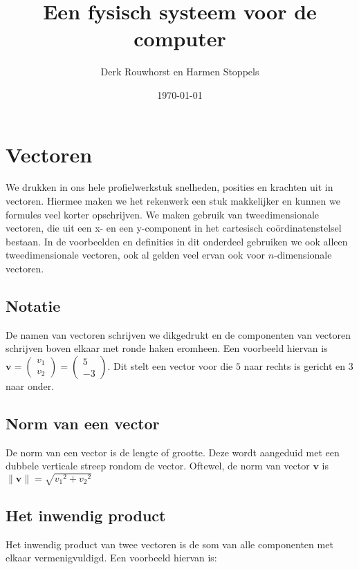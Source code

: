 \documentclass[12pt,a4paper]{article}
\title{Een fysisch systeem voor de computer}
\date{\today}
\author{Derk Rouwhorst en Harmen Stoppels}
\begin{document}
	\begin{titlepage}
	\maketitle
	\end{titlepage}
	
	\section{Vectoren}
	We drukken in ons hele profielwerkstuk snelheden, posities en krachten uit in vectoren. Hiermee maken we het rekenwerk een stuk makkelijker en kunnen we formules veel korter opschrijven. We maken gebruik van tweedimensionale vectoren, die uit een x- en een y-component in het cartesisch co\"{o}rdinatenstelsel bestaan. In de voorbeelden en definities in dit onderdeel gebruiken we ook alleen tweedimensionale vectoren, ook al gelden veel ervan ook voor $n$-dimensionale vectoren.
	
	\subsection{Notatie}
	De namen van vectoren schrijven we dikgedrukt en de componenten van vectoren schrijven boven elkaar met ronde haken eromheen. Een voorbeeld hiervan is $\mathbf{v} = \begin{pmatrix} v_1 \\ v_2 \end{pmatrix} = \begin{pmatrix} 5 \\ -3 \end{pmatrix}$. Dit stelt een vector voor die $5$ naar rechts is gericht en $3$ naar onder.
	
	\subsection{Norm van een vector}
	De norm van een vector is de lengte of grootte. Deze wordt aangeduid met een dubbele verticale streep rondom de vector. Oftewel, de norm van vector $\mathbf{v}$ is $\|\mathbf{v}\| = \sqrt{{v_1}^2+{v_2}^2}$
	
	\subsection{Het inwendig product}
	Het inwendig product van twee vectoren is de som van alle componenten met elkaar vermenigvuldigd. Een voorbeeld hiervan is:
	
\end{document}
